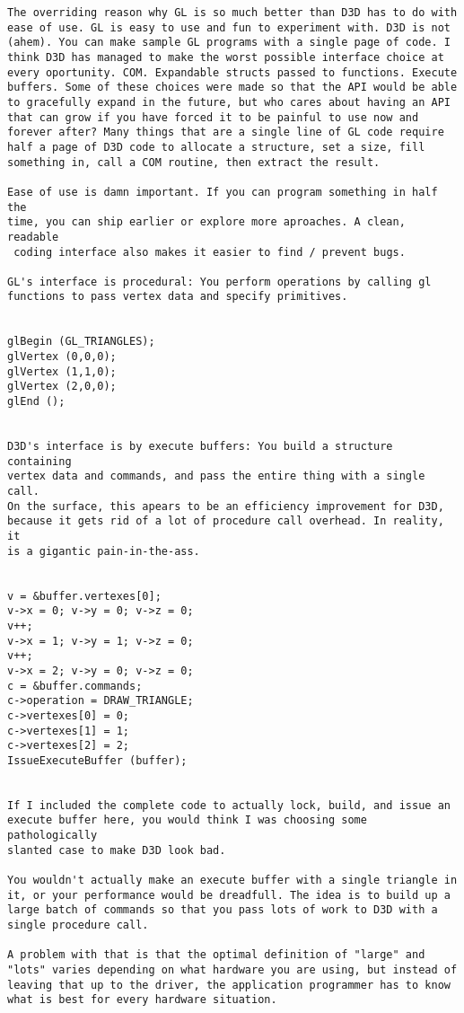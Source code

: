 \begin{verbatim}
The overriding reason why GL is so much better than D3D has to do with
ease of use. GL is easy to use and fun to experiment with. D3D is not
(ahem). You can make sample GL programs with a single page of code. I
think D3D has managed to make the worst possible interface choice at 
every oportunity. COM. Expandable structs passed to functions. Execute
buffers. Some of these choices were made so that the API would be able
to gracefully expand in the future, but who cares about having an API
that can grow if you have forced it to be painful to use now and 
forever after? Many things that are a single line of GL code require 
half a page of D3D code to allocate a structure, set a size, fill 
something in, call a COM routine, then extract the result. 

Ease of use is damn important. If you can program something in half the
time, you can ship earlier or explore more aproaches. A clean, readable
 coding interface also makes it easier to find / prevent bugs. 

GL's interface is procedural: You perform operations by calling gl 
functions to pass vertex data and specify primitives. 


glBegin (GL_TRIANGLES); 
glVertex (0,0,0); 
glVertex (1,1,0); 
glVertex (2,0,0); 
glEnd (); 


D3D's interface is by execute buffers: You build a structure containing 
vertex data and commands, and pass the entire thing with a single call. 
On the surface, this apears to be an efficiency improvement for D3D, 
because it gets rid of a lot of procedure call overhead. In reality, it
is a gigantic pain-in-the-ass. 


v = &buffer.vertexes[0]; 
v->x = 0; v->y = 0; v->z = 0; 
v++; 
v->x = 1; v->y = 1; v->z = 0; 
v++; 
v->x = 2; v->y = 0; v->z = 0; 
c = &buffer.commands; 
c->operation = DRAW_TRIANGLE; 
c->vertexes[0] = 0; 
c->vertexes[1] = 1; 
c->vertexes[2] = 2; 
IssueExecuteBuffer (buffer); 


If I included the complete code to actually lock, build, and issue an 
execute buffer here, you would think I was choosing some pathologically 
slanted case to make D3D look bad. 

You wouldn't actually make an execute buffer with a single triangle in 
it, or your performance would be dreadfull. The idea is to build up a 
large batch of commands so that you pass lots of work to D3D with a 
single procedure call. 

A problem with that is that the optimal definition of "large" and 
"lots" varies depending on what hardware you are using, but instead of
leaving that up to the driver, the application programmer has to know 
what is best for every hardware situation. 


\end{verbatim}

